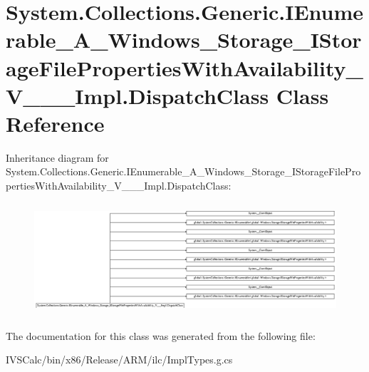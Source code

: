 \hypertarget{class_system_1_1_collections_1_1_generic_1_1_i_enumerable___a___windows___storage___i_storage_fiadb6d37e19c2dc71a5ee1222cae8f944}{}\section{System.\+Collections.\+Generic.\+I\+Enumerable\+\_\+\+A\+\_\+\+Windows\+\_\+\+Storage\+\_\+\+I\+Storage\+File\+Properties\+With\+Availability\+\_\+\+V\+\_\+\+\_\+\+\_\+\+Impl.\+Dispatch\+Class Class Reference}
\label{class_system_1_1_collections_1_1_generic_1_1_i_enumerable___a___windows___storage___i_storage_fiadb6d37e19c2dc71a5ee1222cae8f944}
Inheritance diagram for System.\+Collections.\+Generic.\+I\+Enumerable\+\_\+\+A\+\_\+\+Windows\+\_\+\+Storage\+\_\+\+I\+Storage\+File\+Properties\+With\+Availability\+\_\+\+V\+\_\+\+\_\+\+\_\+\+Impl.\+Dispatch\+Class\+:\begin{figure}[H]
\begin{center}
\leavevmode
\includegraphics[height=4.190476cm]{class_system_1_1_collections_1_1_generic_1_1_i_enumerable___a___windows___storage___i_storage_fiadb6d37e19c2dc71a5ee1222cae8f944}
\end{center}
\end{figure}


The documentation for this class was generated from the following file\+:\begin{DoxyCompactItemize}
\item 
I\+V\+S\+Calc/bin/x86/\+Release/\+A\+R\+M/ilc/Impl\+Types.\+g.\+cs\end{DoxyCompactItemize}
